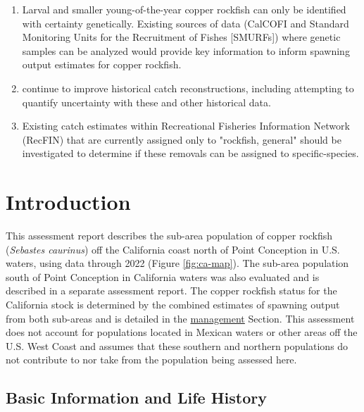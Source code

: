 \documentclass[11pt,
  english,
  letterpaper,
]{article}
\begin{document}
\begin{enumerate}
 \item Larval and smaller young-of-the-year copper rockfish can only be identified with certainty genetically. Existing sources of data (CalCOFI and Standard Monitoring Units for the Recruitment of Fishes [SMURFs]) where genetic samples can be analyzed would provide key information to inform spawning output estimates for copper rockfish.
 
  \item continue to improve historical catch reconstructions, including attempting to quantify uncertainty with these and other historical data.
  
  \item Existing catch estimates within Recreational Fisheries Information Network (RecFIN) that are currently assigned only to "rockfish, general" should be investigated to determine if these removals can be assigned to specific-species.



\end{enumerate}

\pagebreak
\setlength{\parskip}{5mm plus1mm minus1mm}
\setcounter{page}{1}
\renewcommand{\thefigure}{\arabic{figure}}
\renewcommand{\thetable}{\arabic{table}}
\setcounter{table}{0}
\setcounter{figure}{0}

\hypertarget{introduction}{%
\section{Introduction}\label{introduction}}

This assessment report describes the sub-area population of copper rockfish (\emph{Sebastes caurinus}) off the California coast north of Point Conception in U.S. waters, using data through 2022 (Figure \ref{fig:ca-map}). The sub-area population south of Point Conception in California waters was also evaluated and is described in a separate assessment report. The copper rockfish status for the California stock is determined by the combined estimates of spawning output from both sub-areas and is detailed in the \protect\hyperlink{management}{management} Section. This assessment does not account for populations located in Mexican waters or other areas off the U.S. West Coast and assumes that these southern and northern populations do not contribute to nor take from the population being assessed here.

\hypertarget{basic-information-and-life-history}{%
\subsection{Basic Information and Life History}\label{basic-information-and-life-history}}
\end{document}
